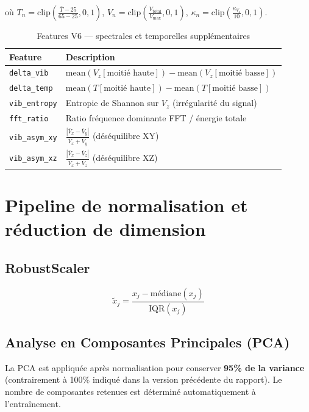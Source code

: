 \documentclass[12pt,a4paper]{report}
\begin{document}
\noindent où $T_n = \text{clip}\!\left(\frac{\bar{T}-25}{65-25}, 0, 1\right)$,
$V_n = \text{clip}\!\left(\frac{V_{\text{total}}}{V_{\text{max}}}, 0, 1\right)$,
$\kappa_n = \text{clip}\!\left(\frac{\kappa_{V_z}}{10}, 0, 1\right)$.

\begin{table}[h]
\centering
\caption{Features V6 — spectrales et temporelles supplémentaires}
\label{tab:feat_v6}
\begin{tabular}{ll}
\toprule
\textbf{Feature} & \textbf{Description} \\
\midrule
\texttt{delta\_vib}   & $\text{mean}(V_z[\text{moitié haute}]) - \text{mean}(V_z[\text{moitié basse}])$ \\
\texttt{delta\_temp}  & $\text{mean}(T[\text{moitié haute}]) - \text{mean}(T[\text{moitié basse}])$ \\
\texttt{vib\_entropy} & Entropie de Shannon sur $V_z$ (irrégularité du signal) \\
\texttt{fft\_ratio}   & Ratio fréquence dominante FFT / énergie totale \\
\texttt{vib\_asym\_xy} & $\frac{|\bar{V}_x - \bar{V}_y|}{\bar{V}_x + \bar{V}_y}$ (déséquilibre XY) \\
\texttt{vib\_asym\_xz} & $\frac{|\bar{V}_x - \bar{V}_z|}{\bar{V}_x + \bar{V}_z}$ (déséquilibre XZ) \\
\bottomrule
\end{tabular}
\end{table}

\section{Pipeline de normalisation et réduction de dimension}

\subsection{RobustScaler}
\begin{equation}
  \tilde{x}_j = \frac{x_j - \text{médiane}(x_j)}{\text{IQR}(x_j)}
\end{equation}

\subsection{Analyse en Composantes Principales (PCA)}

La PCA est appliquée après normalisation pour conserver \textbf{95\% de la variance}
(contrairement à 100\% indiqué dans la version précédente du rapport). Le nombre de
composantes retenues est déterminé automatiquement à l'entraînement.
\end{document}
